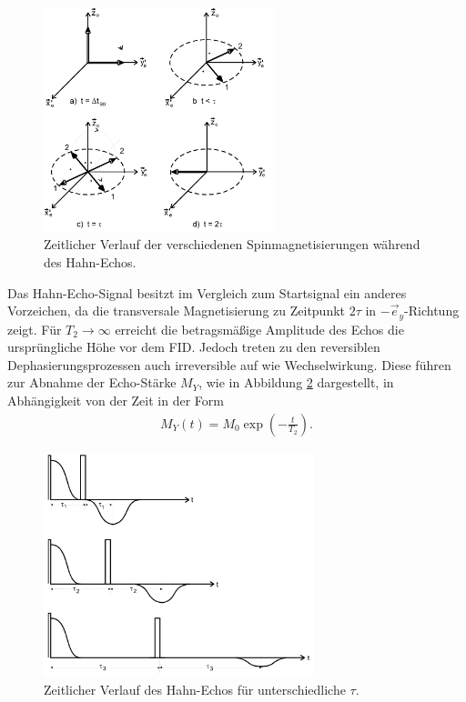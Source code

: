 \begin{figure}
  \centering
  \includegraphics[width=0.6\textwidth]{spin-echo.PNG}
  \caption{Zeitlicher Verlauf der verschiedenen Spinmagnetisierungen während des Hahn-Echos.\cite{sample}}
  \label{fig:spin-echo}
\end{figure}
\FloatBarrier
Das Hahn-Echo-Signal besitzt im Vergleich zum Startsignal
ein anderes Vorzeichen, da die transversale
Magnetisierung zu Zeitpunkt $2\tau$ in $-\vec{e}_y$-Richtung zeigt.
Für $T_2\rightarrow\infty$ erreicht die betragsmäßige
Amplitude des Echos die
ursprüngliche Höhe vor dem FID.
Jedoch treten zu den reversiblen Dephasierungsprozessen auch
irreversible auf wie Wechselwirkung. Diese führen zur Abnahme der Echo-Stärke $M_Y$,
wie in Abbildung \ref{fig:tau_ver} dargestellt,
in Abhängigkeit von der Zeit in der Form
\begin{align}
  M_Y(t)=M_0 \exp\left(-\frac{t}{T_2}\right).\label{eqn:t2}
\end{align}
\FloatBarrier
\begin{figure}
  \centering
  \includegraphics[width=0.7\textwidth]{tau_ver.PNG}
  \caption{Zeitlicher Verlauf des Hahn-Echos für unterschiedliche $\tau$.\cite{sample}}
  \label{fig:tau_ver}
\end{figure}
\FloatBarrier

